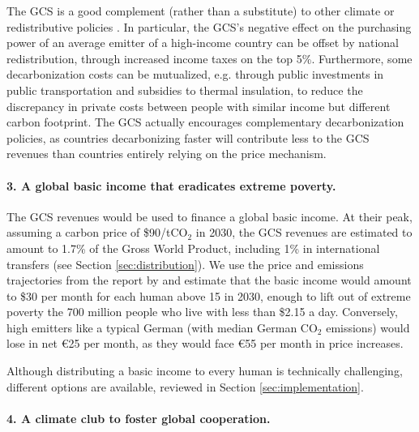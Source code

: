 \documentclass[12pt,english]{article}
\begin{document}
The GCS is a good complement (rather than a substitute) to other climate or redistributive policies \citep{stiglitz_addressing_2019}. In particular, the GCS's negative effect on the purchasing power of an average emitter of a high-income country can be offset by national redistribution, through increased income taxes on the top 5\%. Furthermore, some decarbonization costs can be mutualized, e.g. through public investments in public transportation and subsidies to thermal insulation, to reduce the discrepancy in private costs between people with similar income but different carbon footprint. The GCS actually encourages complementary decarbonization policies, as countries decarbonizing faster will contribute less to the GCS revenues than countries entirely relying on the price mechanism. %

\paragraph*{3. A global basic income that eradicates extreme poverty.}

The GCS revenues would be used to finance a global basic income. At their peak,  assuming a carbon price of \$90/tCO$_\text{2}$ in 2030, the GCS revenues are estimated to amount to 1.7\% of the Gross World Product, including 1\% in international transfers (see Section \ref{sec:distribution}). We use the price and emissions trajectories from the report by \citet{stern_report_2017} and estimate that the basic income would amount to \$30 per month for each human above 15 in 2030, enough to lift out of extreme poverty the 700 million people who live with less than \$2.15 a day. Conversely, high emitters like a typical German (with median German CO$_\text{2}$ emissions) would lose in net \euro{}25 per month, as they would face \euro{}55 per month in price increases. %

Although distributing a basic income to every human is technically challenging, different options are available, reviewed in Section \ref{sec:implementation}. 

\paragraph*{4. A climate club to foster global cooperation.}
\end{document}
